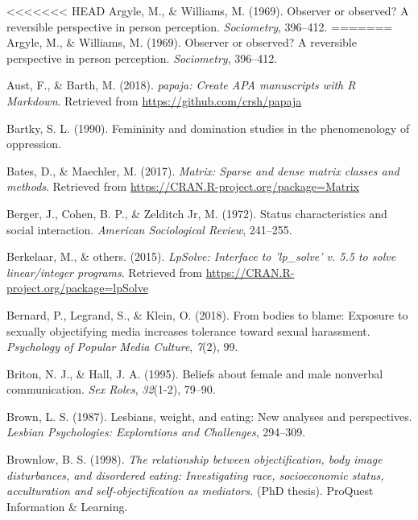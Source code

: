 \documentclass[
  man]{apa6}
\begin{document}
\newpage

\begingroup
\setlength{\parindent}{-0.5in}
\setlength{\leftskip}{0.5in}

\hypertarget{refs}{}
<<<<<<< HEAD
\leavevmode\hypertarget{ref-argyle1969}{}%
Argyle, M., \& Williams, M. (1969). Observer or observed? A reversible perspective in person perception. \emph{Sociometry}, 396--412.
=======
\hypertarget{ref-argyle1969}{}
Argyle, M., \& Williams, M. (1969). Observer or observed? A reversible
perspective in person perception. \emph{Sociometry}, 396--412.

\hypertarget{ref-R-papaja}{}
Aust, F., \& Barth, M. (2018). \emph{papaja: Create APA manuscripts with
R Markdown}. Retrieved from \url{https://github.com/crsh/papaja}

\hypertarget{ref-Bartky}{}
Bartky, S. L. (1990). Femininity and domination studies in the
phenomenology of oppression.

\hypertarget{ref-R-Matrix}{}
Bates, D., \& Maechler, M. (2017). \emph{Matrix: Sparse and dense matrix
classes and methods}. Retrieved from
\url{https://CRAN.R-project.org/package=Matrix}

\hypertarget{ref-berger1972}{}
Berger, J., Cohen, B. P., \& Zelditch Jr, M. (1972). Status
characteristics and social interaction. \emph{American Sociological
Review}, 241--255.

\hypertarget{ref-R-lpSolve}{}
Berkelaar, M., \& others. (2015). \emph{LpSolve: Interface to
'lp\_solve' v. 5.5 to solve linear/integer programs}. Retrieved from
\url{https://CRAN.R-project.org/package=lpSolve}

\hypertarget{ref-bernard2018bodies}{}
Bernard, P., Legrand, S., \& Klein, O. (2018). From bodies to blame:
Exposure to sexually objectifying media increases tolerance toward
sexual harassment. \emph{Psychology of Popular Media Culture},
\emph{7}(2), 99.

\hypertarget{ref-briton1995}{}
Briton, N. J., \& Hall, J. A. (1995). Beliefs about female and male
nonverbal communication. \emph{Sex Roles}, \emph{32}(1-2), 79--90.

\hypertarget{ref-brown1987lesbians}{}
Brown, L. S. (1987). Lesbians, weight, and eating: New analyses and
perspectives. \emph{Lesbian Psychologies: Explorations and Challenges},
294--309.

\hypertarget{ref-brownlow1998relationship}{}
Brownlow, B. S. (1998). \emph{The relationship between objectification,
body image disturbances, and disordered eating: Investigating race,
socioeconomic status, acculturation and self-objectification as
mediators.} (PhD thesis). ProQuest Information \& Learning.
\end{document}
